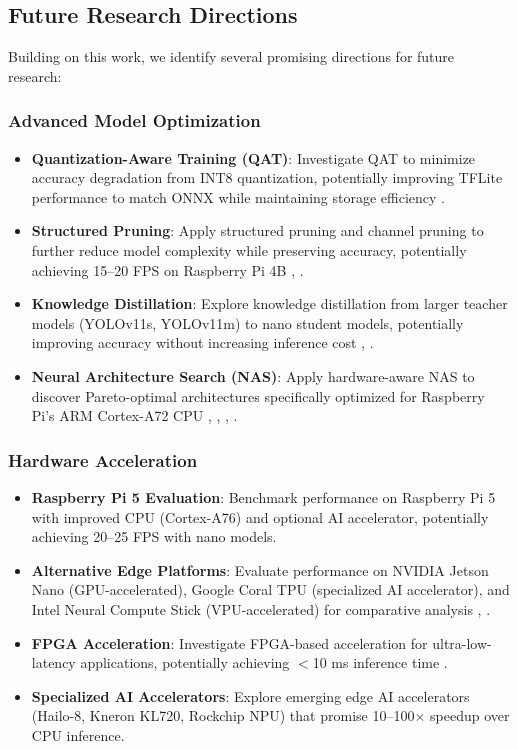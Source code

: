 \subsection{Future Research Directions}

Building on this work, we identify several promising directions for future research:

\subsubsection{Advanced Model Optimization}

\begin{itemize}
\item \textbf{Quantization-Aware Training (QAT)}: Investigate QAT to minimize accuracy degradation from INT8 quantization, potentially improving TFLite performance to match ONNX while maintaining storage efficiency \cite{43}.

\item \textbf{Structured Pruning}: Apply structured pruning and channel pruning to further reduce model complexity while preserving accuracy, potentially achieving 15--20 FPS on Raspberry Pi 4B \cite{2}, \cite{46}.

\item \textbf{Knowledge Distillation}: Explore knowledge distillation from larger teacher models (YOLOv11s, YOLOv11m) to nano student models, potentially improving accuracy without increasing inference cost \cite{19}, \cite{48}.

\item \textbf{Neural Architecture Search (NAS)}: Apply hardware-aware NAS to discover Pareto-optimal architectures specifically optimized for Raspberry Pi's ARM Cortex-A72 CPU \cite{36}, \cite{37}, \cite{38}, \cite{40}.
\end{itemize}

\subsubsection{Hardware Acceleration}

\begin{itemize}
\item \textbf{Raspberry Pi 5 Evaluation}: Benchmark performance on Raspberry Pi 5 with improved CPU (Cortex-A76) and optional AI accelerator, potentially achieving 20--25 FPS with nano models.

\item \textbf{Alternative Edge Platforms}: Evaluate performance on NVIDIA Jetson Nano (GPU-accelerated), Google Coral TPU (specialized AI accelerator), and Intel Neural Compute Stick (VPU-accelerated) for comparative analysis \cite{20}, \cite{47}.

\item \textbf{FPGA Acceleration}: Investigate FPGA-based acceleration for ultra-low-latency applications, potentially achieving $<$10 ms inference time \cite{20}.

\item \textbf{Specialized AI Accelerators}: Explore emerging edge AI accelerators (Hailo-8, Kneron KL720, Rockchip NPU) that promise 10--100$\times$ speedup over CPU inference.
\end{itemize}


